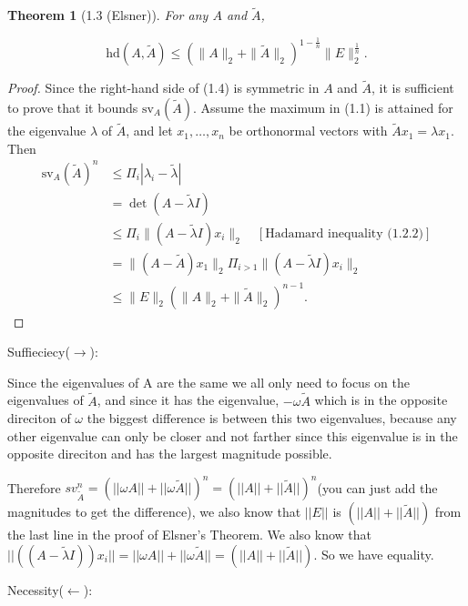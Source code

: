 \documentclass[11pt]{article}
\newtheorem{theorem}{Theorem}
\newcommand\0{\mathbf{0}}
\newcommand\<{\langle}
\renewcommand\>{\rangle}
\begin{document}
\begin{enumerate}
\begin{theorem}[1.3 (Elsner)]
For any \( A \) and \( \tilde{A} \),

\[
\text{hd}(A, \tilde{A}) \leq (\|A\|_2 + \|\tilde{A}\|_2)^{1 - \frac{1}{n}} \|E\|_{2}^{\frac{1}{n}}.
\]
\end{theorem}

\begin{proof}
Since the right-hand side of (1.4) is symmetric in \( A \) and \( \tilde{A} \), it is sufficient to prove that it bounds \( \text{sv}_A(\tilde{A}) \). Assume the maximum in (1.1) is attained for the eigenvalue \( \lambda \) of \( \tilde{A} \), and let \( x_1, \ldots, x_n \) be orthonormal vectors with \( \tilde{A}x_1 = \lambda x_1 \). Then
\[
\begin{aligned}
\text{sv}_A(\tilde{A})^n &\leq \Pi_i |\lambda_i - \tilde{\lambda}| \\
&= \det(A - \tilde{\lambda}I) \\
&\leq \Pi_i \|(A - \tilde{\lambda}I)x_i\|_2 \quad [\text{Hadamard inequality (1.2.2)}] \\
&= \|(A - \tilde{A})x_1\|_2 \Pi_{i>1} \|(A - \tilde{\lambda}I)x_i\|_2 \\
&\leq \|E\|_2 (\|A\|_2 + \|\tilde{A}\|_2)^{n-1}.
\end{aligned}
\]
\end{proof}

Suffieciecy($\rightarrow$):

Since the eigenvalues of A are the same we all only need to focus on the eigenvalues of $\tilde A$, and since it has the eigenvalue,
$-\omega \tilde A$ which is in the opposite direciton of $\omega$ the biggest difference is between this two eigenvalues, because 
any other eigenvalue can only be closer and not farther since this eigenvalue is in the opposite direciton and has the largest magnitude possible. 

Therefore $sv_{\tilde A}^{n}=( ||\omega A|| + || \omega \tilde A||)^{n} = ( || A|| + || \tilde A||)^{n} $(you can just add the magnitudes to get the difference), we also know that $||E||$ is $ ( || A|| + || \tilde A||)$ from the last line in the 
proof of Elsner's Theorem. We also know that $||((A - \tilde \lambda I))x_{i}||=|| \omega A|| +  || \omega \tilde A||=( || A|| + || \tilde A||)$. So we have equality.

Necessity($\leftarrow$):


\end{enumerate}
\end{document}
